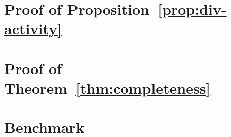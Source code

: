 
\appendix

\section{Proof of Proposition~\ref{prop:div-activity}}\label{ap:div-activity}



\section{Proof of Theorem~\ref{thm:completeness}}\label{ap:completeness}



\section{Benchmark}\label{ap:benchmark}


